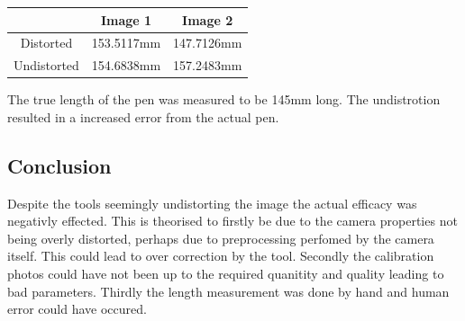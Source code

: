 \begin{center}
\begin{tabular}{ c | c c }
       & Image 1 & Image 2 \\ 
       \hline
 Distorted & 153.5117mm & 147.7126mm \\  
 Undistorted & 154.6838mm & 157.2483mm    
\end{tabular}
\end{center}

The true length of the pen was measured to be 145mm long. The undistrotion resulted in a increased error from the actual pen.

\subsection{Conclusion}

Despite the tools seemingly undistorting the image the actual efficacy was negativly effected. This is theorised to firstly be due to the camera properties not being overly distorted, perhaps due to preprocessing perfomed by the camera itself. This could lead to over correction by the tool. 
Secondly the calibration photos could have not been up to the required quanitity and quality leading to bad parameters. 
Thirdly the length measurement was done by hand and human error could have occured.